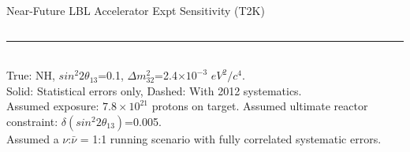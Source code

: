 \begin{frame}{Near-Future LBL Accelerator Expt Sensitivity (T2K)}
\begin{columns}[T]
\begin{column}{0.52\textwidth}
\begin{center}
    \end{center}
  \end{column}
\end{columns}

\noindent\rule{2cm}{0.4pt}\\
{\tiny
 True: NH, $sin^{2}2{\theta}_{13}$=0.1, ${\Delta}m^{2}_{32}$=2.4$\times10^{-3}$ $eV^{2}/c^{4}$.\\
 Solid: Statistical errors only, Dashed: With 2012 systematics.\\
 Assumed exposure: $7.8\times10^{21}$ protons on target.
 Assumed ultimate reactor constraint: $\delta(sin^{2}2{\theta}_{13})$=0.005.\\
 Assumed a $\nu$:$\bar{\nu}$ = 1:1 running scenario with fully correlated systematic errors.\\
}
\end{frame}



